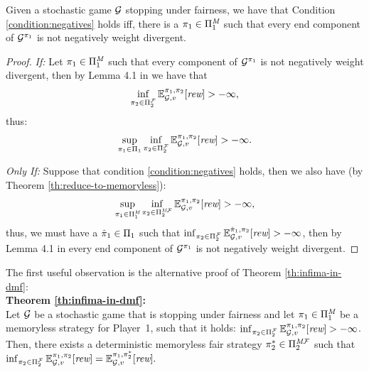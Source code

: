 \begin{theorem}\label{th:equiv-A-neg-component} Given a stochastic game $\mathcal{G}$ stopping under fairness, we have that Condition \ref{condition:negatives} holds iff,
there is a $\pi_{1} \in \Pi^{\textit{M}}_{1}$ such that every end component of $\mathcal{G}^{\pi_{1}}$ is not negatively weight divergent.
\end{theorem}	
\begin{proof} 

\noindent \emph{If:} Let $\pi_{1} \in \Pi^{\textit{M}}_{1}$ such  that every component of $\mathcal{G}^{\pi_{1}}$ is not negatively weight divergent, then by Lemma 4.1 in \cite{DBLP:conf/lics/Baier0DGS18} we have that 
\[
\inf_{\pi_{2} \in \Pi^{\mathcal{F}}_{2}} \mathbb{E}^{\pi_{1}, \pi_{2}}_{\mathcal{G},v}[\textit{rew}] > - \infty,
\]
thus: 
\[
\sup_{\pi_{1} \in \Pi_{1}} \inf_{\pi_{2} \in \Pi^{\mathcal{F}}_{2}} \mathbb{E}^{\pi_{1}, \pi_{2}}_{\mathcal{G},v}[\textit{rew}] > - \infty.
\]

\noindent \emph{Only If:} Suppose that condition \ref{condition:negatives} holds, then we also have (by Theorem \ref{th:reduce-to-memoryless}):
\[
\sup_{\pi_{1} \in \Pi^{\textit{M}}_{1}} \inf_{\pi_{2} \in \Pi^{\textit{M}\mathcal{F}}_{2}} \mathbb{E}^{\pi_{1}, \pi_{2}}_{\mathcal{G},v}[\textit{rew}] > - \infty, 
\]
thus, we must have a $\hat{\pi}_{1} \in \Pi_{1}$ such that $\inf_{\pi_{2} \in \Pi^{\mathcal{F}}_{2}} \mathbb{E}^{\hat{\pi}_{1}, \pi_{2}}_{\mathcal{G},v}[\textit{rew}] > - \infty$,  then by Lemma 4.1 in \cite{DBLP:conf/lics/Baier0DGS18}  every end component of $\mathcal{G}^{\pi_{1}}$ is not negatively weight divergent.
\end{proof}
	The first useful observation is the alternative proof of  Theorem \ref{th:infima-in-dmf}:\\
\noindent \textbf{Theorem \ref{th:infima-in-dmf}:} \\%
  Let $\mathcal{G}$ be a stochastic game that is stopping under fairness
  and let $\pi_{1} \in \Pi^{\textit{M}}_{1}$ be a memoryless
  strategy for Player~1,   such that it holds: $\inf_{\pi_{2} \in \Pi^{\mathcal{F}}_{2} }  \mathbb{E}^{\pi_{1}, \pi_{2}}_{\mathcal{G},v}[\textit{rew}] > -\infty$.  Then, there exists a deterministic memoryless fair
  strategy $\pi^*_{2}\in\Pi^{\textit{M}\mathcal{F}}_{2}$ such that
  $\inf_{\pi_{2} \in \Pi^{\mathcal{F}}_{2}} \mathbb{E}^{\pi_{1}, \pi_{2}}_{\mathcal{G},v}[\textit{rew}]
   =
   \mathbb{E}^{\pi_{1}, \pi^*_{2}}_{\mathcal{G},v}[\textit{rew}].$
